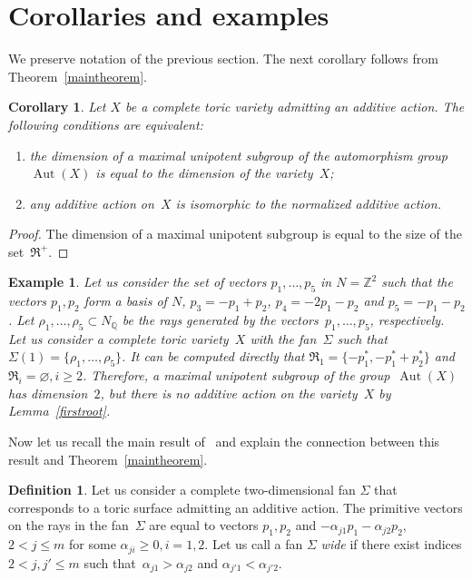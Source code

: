 \documentclass[a4paper,reqno,12pt]{amsart}
\DeclareMathOperator {\Aut}{Aut}
\def\Z  {\mathbb Z}
\def\Q  {\mathbb Q}
\let\emptyset\varnothing
\newtheorem{example}{Example}
\newtheorem{corollary}{Corollary}
\theoremstyle{definition}
\newtheorem{defn}{Definition}
\begin{document}
\section{Corollaries and examples}\label{example}
We preserve notation of the previous section.
The next corollary follows from Theorem~\ref{maintheorem}.
\begin{corollary}
  Let $X$ be a complete toric variety admitting an additive action.
  The following conditions are equivalent:
  \begin{enumerate}
  \item the dimension of a maximal unipotent subgroup of the automorphism group~$\Aut(X)$ is equal to the dimension of the variety~$X$;
  \item any additive action on~$X$ is isomorphic to the normalized additive action.
  \end{enumerate}

\end{corollary}
\begin{proof}
The dimension of a maximal unipotent subgroup is equal to the size of the set~$\mathfrak{R}^+$.
\end{proof}
  
\begin{example}
 Let us consider the set of vectors $p_1, \ldots, p_5$ in $N=\Z^2$
  such that the vectors $p_1, p_2$ form a basis of $N$, ${p_{3}=-p_1+p_2}$, ${p_4=-2p_1-p_2}$ and ${p_{5}=-p_1-p_2}$.
  Let  $\rho_1, \ldots, \rho_{5} \subset N_{\Q}$ be the rays generated by the vectors~$p_1, \ldots, p_{5}$, respectively.
  Let us consider a complete toric variety~$X$ with the fan~$\Sigma$ such that~$\Sigma(1) = \{\rho_1, \ldots, \rho_{5}\}$.
  It can be computed directly that $\mathfrak{R}_1=\{-p_1^*, -p_1^*+p_2^*\}$ and $\mathfrak R_i=\emptyset, i\geq 2$.
  Therefore, a maximal unipotent subgroup of the group~$\Aut(X)$ has dimension~$2$, but there is no additive action on the variety~$X$ by Lemma~\ref{firstroot}.

   
\end{example}

Now let us recall the main result of~\cite{S} and explain the connection between this result and Theorem~\ref{maintheorem}.

\begin{defn}\label{defwide}
  Let us consider a complete two-dimensional fan $\Sigma$ that corresponds to a toric surface admitting an additive action.
  The primitive vectors on the rays in the fan~$\Sigma$ are equal to vectors ${p_1, p_2}$ and ${-\alpha_{j1}p_1-\alpha_{j2}p_2}$, ${2 < j \leq m}$ for some $\alpha_{ji} \geq 0, i=1,2$.
  Let us call a fan $\Sigma$ \emph{wide} if  there exist indices ${2 < j, j' \leq m}$ such that~${\alpha_{j1} > \alpha_{j2}}$ and ${\alpha_{j'1} < \alpha_{j'2}}$.
\end{defn}
\end{document}
